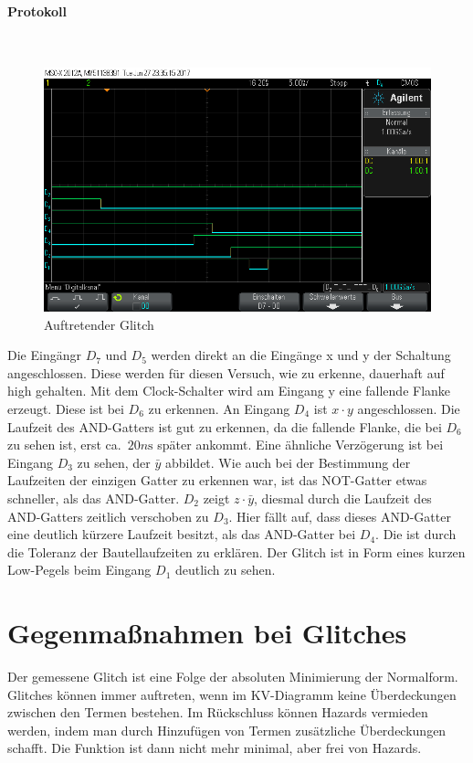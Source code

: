 \documentclass[10pt]{scrreprt}
\begin{document}
    \paragraph{Protokoll}
    $ $
    \begin{figure}[H]
        \includegraphics[width=\textwidth]{scope_12.png}
        \caption{Auftretender Glitch}
    \end{figure}

    Die Eingängr $D_7$ und $D_5$ werden direkt an die Eingänge x und y der Schaltung
    angeschlossen. Diese werden für diesen Versuch, wie zu erkenne, dauerhaft auf
    high gehalten. Mit dem Clock-Schalter wird am Eingang y eine fallende Flanke
    erzeugt. Diese ist bei $D_6$ zu erkennen. An Eingang $D_4$ ist $x \cdot y$
    angeschlossen. Die Laufzeit des AND-Gatters ist gut zu erkennen, da die fallende
    Flanke, die bei $D_6$ zu sehen ist, erst ca.~$20\si{n\second}$ später ankommt.
    Eine ähnliche Verzögerung ist bei Eingang $D_3$ zu sehen, der $\bar{y}$ abbildet.
    Wie auch bei der Bestimmung der Laufzeiten der einzigen Gatter zu erkennen war,
    ist das NOT-Gatter etwas schneller, als das AND-Gatter.
    $D_2$ zeigt $z \cdot \bar{y}$, diesmal durch die Laufzeit des AND-Gatters
    zeitlich verschoben zu $D_3$. Hier fällt auf, dass dieses AND-Gatter eine
    deutlich kürzere Laufzeit besitzt, als das AND-Gatter bei $D_4$. Die ist durch
    die Toleranz der Bautellaufzeiten zu erklären.
    Der Glitch ist in Form eines kurzen Low-Pegels beim Eingang $D_1$ deutlich
    zu sehen.

    \section{Gegenmaßnahmen bei Glitches}
    Der gemessene Glitch ist eine Folge der absoluten Minimierung der Normalform. Glitches
    können immer auftreten, wenn im KV-Diagramm keine Überdeckungen zwischen den
    Termen bestehen. Im Rückschluss können Hazards vermieden werden, indem man durch
    Hinzufügen von Termen zusätzliche Überdeckungen schafft. Die Funktion ist dann nicht
    mehr minimal, aber frei von Hazards.
\end{document}
